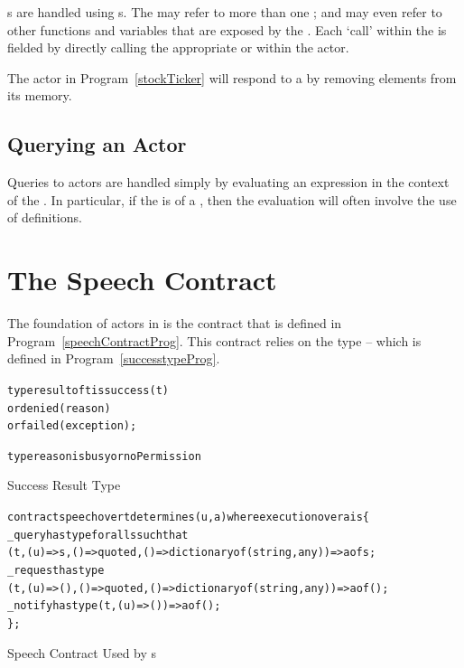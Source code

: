 s are handled using s. The  may refer to more than one ; and may even refer to other functions and variables that are exposed by the . Each `call' within the  is fielded by directly calling the appropriate  or  within the actor.


The  actor in Program~\vref{stockTicker} will respond to a   by removing elements from its memory.


\subsection{Querying an Actor}
\label{actorQuery}

Queries to actors are handled simply by evaluating an expression in the context of the . In particular, if the  is of a , then the evaluation will often involve the use of  definitions.

\section{The Speech Contract}
\label{speechContract}
The foundation of actors in \Sr is the  contract that is defined in Program~\vref{speechContractProg}. This contract relies on the  type -- which is defined in Program~\vref{successtypeProg}.

\begin{program}
\begin{alltt}
type result of t is success(t)
  or denied(reason)
  or failed(exception);

type reason is busy or noPermission
\end{alltt}
\caption{Success Result Type}
\label{successTypeProg}
\end{program}


\begin{program}
\begin{alltt}
contract speech over t determines (u,a) where execution over a is \{
  _query has type for all s such that 
              (t,(u)=>s,()=>quoted,()=>dictionary of (string,any))=>a of s;
  _request has type
              (t,(u)=>(),()=>quoted,()=>dictionary of (string,any)) => a of ();
  _notify has type (t,(u)=>()) => a of ();
\};
\end{alltt}
\caption{Speech Contract Used by s}
\label{speechContractProg}
\end{program}


